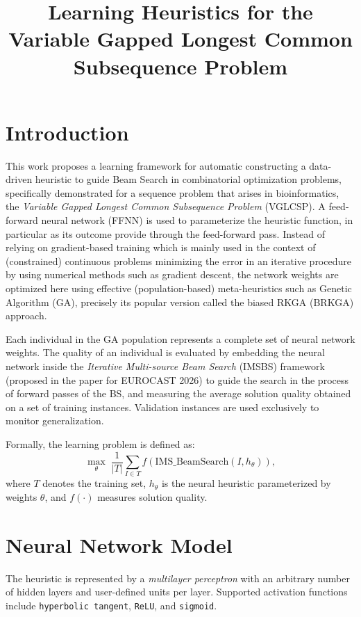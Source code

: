\documentclass[11pt,a4paper]{article}
\title{Learning Heuristics for the Variable Gapped Longest Common Subsequence Problem}
\author{}
\date{}
\begin{document}
\maketitle

\section{Introduction}

This work proposes a learning framework for automatic constructing a data-driven heuristic to guide Beam Search in combinatorial optimization problems, specifically demonstrated for a sequence problem that arises in bioinformatics, the \textit{Variable Gapped Longest Common Subsequence Problem} (VGLCSP). A feed-forward neural network (FFNN) is used to parameterize the heuristic function, in particular as its outcome provide through the feed-forward pass.  Instead of relying on gradient-based training which is mainly used in the context of (constrained) continuous problems minimizing the error in an iterative procedure by using numerical methods such as gradient descent, the network weights are optimized here using effective (population-based) meta-heuristics such as Genetic Algorithm (GA), precisely its popular version  called the  biased RKGA (BRKGA) approach.  

Each individual in the GA population represents a complete set of neural network weights. The quality of an individual is evaluated by embedding the neural network inside the \textit{Iterative Multi-source Beam Search} (IMSBS) framework (proposed in the paper for EUROCAST 2026) to guide the search in the process of  forward passes of the BS,  
and measuring the average solution quality obtained on a set of training instances. Validation instances are used exclusively to monitor generalization.

Formally, the learning problem is defined as:
\[
\max_{\theta} \; \frac{1}{|T|} \sum_{I \in T} f(\text{IMS\_BeamSearch}(I, h_\theta)),
\]
where $T$ denotes the training set, $h_\theta$ is the neural heuristic parameterized by weights $\theta$, and $f(\cdot)$ measures solution quality.

\section{Neural Network Model}

The heuristic is represented by a \textit{multilayer perceptron} with an arbitrary number of hidden layers and user-defined units per layer. Supported activation functions include \texttt{hyperbolic tangent}, \texttt{ReLU}, and \texttt{sigmoid}.
\end{document}
